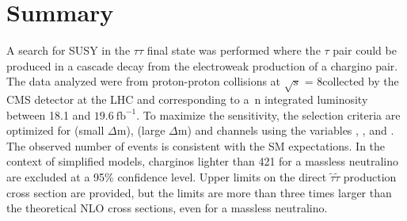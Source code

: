 \section{Summary}
\label{sect:conclusion}
A search for SUSY in the $\tau\tau$ final state was performed where the
$\tau$ pair could be produced in a cascade decay from the electroweak production of a chargino pair.  The data analyzed were from proton-proton collisions
at $\sqrt{s}$ = 8\TeV collected by the CMS detector at the LHC and corresponding to a\
n integrated luminosity between 18.1 and $19.6~\mathrm{fb}^{-1}$.%
To maximize the sensitivity, the selection criteria are optimized for \tauTau (small $\Delta$m), 
\tauTau (large $\Delta$m) and \leptonTau channels using the variables \mttwo, \tauMT, and \SumMT.
The observed number of events is consistent with the SM expectations. 
In the context of simplified models, charginos lighter than 421\GeV 
for a massless neutralino are excluded at a 95\% confidence level.
Upper limits on the direct $\tilde{\tau}\tilde{\tau}$ production cross section are provided, but the limits are more than three times
larger than the theoretical NLO cross sections, 
even for a massless neutralino.

